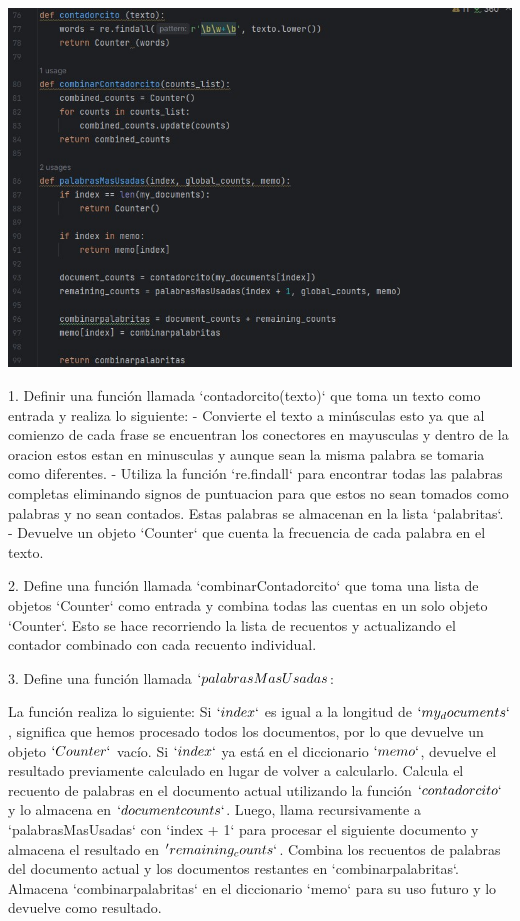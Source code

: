 \documentclass[a4paper,twocolumn,10pt]{article}
\begin{document}
\includegraphics[width=0.8\linewidth]{imagenes/codigo 1.jpg}


1. Definir una función llamada `contadorcito(texto)` que toma un texto como entrada y realiza lo siguiente:
   - Convierte el texto a minúsculas esto ya que al comienzo de cada frase se encuentran los conectores en mayusculas y dentro de la oracion estos estan en minusculas y aunque sean la misma palabra se tomaria como diferentes. 
   - Utiliza la función `re.findall` para encontrar todas las palabras completas eliminando signos de puntuacion para que estos no sean tomados como palabras y no sean contados. Estas palabras se almacenan en la lista `palabritas`.
   - Devuelve un objeto `Counter` que cuenta la frecuencia de cada palabra en el texto.

2. Define una función llamada `combinarContadorcito` que toma una lista de objetos `Counter` como entrada y combina todas las cuentas en un solo objeto `Counter`. Esto se hace recorriendo la lista de recuentos y actualizando el contador combinado con cada recuento individual.

3. Define una función llamada $`palabrasMasUsadas$:

   La función realiza lo siguiente:
   Si $`index`$ es igual a la longitud de $`my_documents`$, significa que hemos procesado todos los documentos, por lo que devuelve un objeto $`Counter`$ vacío.
   Si $`index`$ ya está en el diccionario $`memo`$, devuelve el resultado previamente calculado en lugar de volver a calcularlo.
   Calcula el recuento de palabras en el documento actual utilizando la función $`contadorcito`$ y lo almacena en $`document counts`$.
   Luego, llama recursivamente a `palabrasMasUsadas` con `index + 1` para procesar el siguiente documento y almacena el resultado en $'remaining_counts`$.
   Combina los recuentos de palabras del documento actual y los documentos restantes en `combinarpalabritas`.
   Almacena `combinarpalabritas` en el diccionario `memo` para su uso futuro y lo devuelve como resultado.
\end{document}
